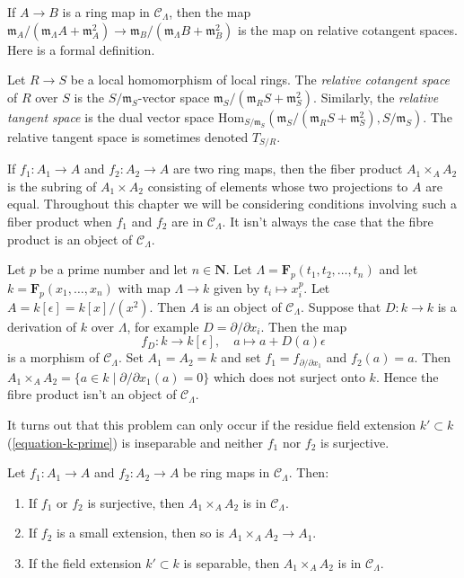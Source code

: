 \noindent
If $A \to B$ is a ring map in $\mathcal{C}_\Lambda$, then the map
$\mathfrak m_A/(\mathfrak m_\Lambda A + \mathfrak m_A^2)
\to \mathfrak m_B/(\mathfrak m_\Lambda B + \mathfrak m_B^2)$
is the map on relative cotangent spaces. Here is a formal definition.

\begin{definition}
\label{definition-tangent-space-ring}
Let $R \to S$ be a local homomorphism of local rings. The
{\it relative cotangent space} of $R$ over $S$ is the
$S/\mathfrak m_S$-vector space
$\mathfrak m_S/(\mathfrak m_R S + \mathfrak m_S^2)$.
Similarly, the {\it relative tangent space} is the dual vector
space $\text{Hom}_{S/\mathfrak m_S}(
\mathfrak m_S/(\mathfrak m_R S + \mathfrak m_S^2), S/\mathfrak m_S)$.
The relative tangent space is sometimes denoted $T_{S/R}$.
\end{definition}

\noindent
If $f_1: A_1 \to A$ and $f_2: A_2 \to A$ are two ring maps, then the fiber
product $A_1 \times_A A_2$ is the subring of $A_1 \times A_2$ consisting of
elements whose two projections to $A$ are equal. Throughout this chapter we
will be considering conditions involving such a fiber product when $f_1$
and $f_2$ are in $\mathcal{C}_\Lambda$. It isn't always the case that the
fibre product is an object of $\mathcal{C}_\Lambda$.

\begin{example}
\label{example-fibre-product}
Let $p$ be a prime number and let $n \in \mathbf{N}$.
Let $\Lambda = \mathbf{F}_p(t_1, t_2, \ldots, t_n)$ and let
$k = \mathbf{F}_p(x_1, \ldots, x_n)$ with map $\Lambda \to k$ given
by $t_i \mapsto x_i^p$. Let $A = k[\epsilon] = k[x]/(x^2)$.
Then $A$ is an object of $\mathcal{C}_\Lambda$. Suppose that
$D : k \to k$ is a derivation of $k$ over $\Lambda$, for example
$D = \partial/\partial x_i$. Then the map
$$
f_D : k \longrightarrow k[\epsilon],\quad
a \mapsto a + D(a)\epsilon
$$
is a morphism of $\mathcal{C}_\Lambda$. Set $A_1 = A_2 = k$ and set
$f_1 = f_{\partial/\partial x_1}$ and $f_2(a) = a$. Then
$A_1 \times_A A_2 = \{a \in k \mid \partial/\partial x_1(a) = 0\}$
which does not surject onto $k$. Hence the fibre product isn't
an object of $\mathcal{C}_\Lambda$.
\end{example}

\noindent
It turns out that this problem can only occur if the residue field
extension $k' \subset k$ (\ref{equation-k-prime}) is inseparable
and neither $f_1$ nor $f_2$ is surjective.

\begin{lemma}
\label{lemma-fiber-product-CLambda}
Let $f_1 : A_1 \to A$ and $f_2 : A_2 \to A$ be ring maps in 
$\mathcal{C}_\Lambda$. Then:
\begin{enumerate}
\item If $f_1$ or $f_2$ is surjective, then
$A_1 \times_A A_2$ is in $\mathcal{C}_\Lambda$.
\item If $f_2$ is a small extension, then so is
$A_1 \times_A A_2 \to A_1$.
\item If the field extension $k' \subset k$ is separable, then
$A_1 \times_A A_2$ is in $\mathcal{C}_\Lambda$.
\end{enumerate}
\end{lemma}

